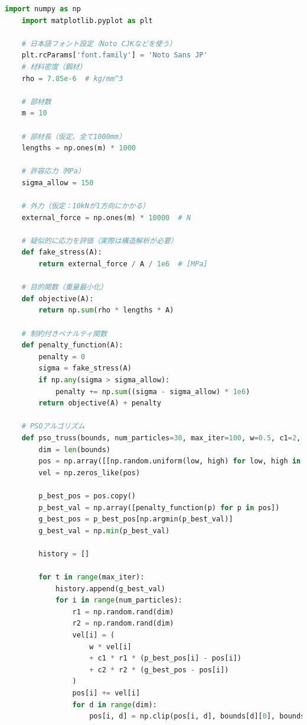 \begin{lstlisting}[language=Python, caption=PSOによるトラス構造の最適設計, label=lst:kadai7_code]
    import numpy as np
    import matplotlib.pyplot as plt
    
    # 日本語フォント設定（Noto CJKなどを使う）
    plt.rcParams['font.family'] = 'Noto Sans JP'
    # 材料密度（鋼材）
    rho = 7.85e-6  # kg/mm^3
    
    # 部材数
    m = 10
    
    # 部材長（仮定、全て1000mm）
    lengths = np.ones(m) * 1000
    
    # 許容応力（MPa）
    sigma_allow = 150
    
    # 外力（仮定：10kNが1方向にかかる）
    external_force = np.ones(m) * 10000  # N
    
    # 疑似的に応力を評価（実際は構造解析が必要）
    def fake_stress(A):
        return external_force / A / 1e6  # [MPa]
    
    # 目的関数（重量最小化）
    def objective(A):
        return np.sum(rho * lengths * A)
    
    # 制約付きペナルティ関数
    def penalty_function(A):
        penalty = 0
        sigma = fake_stress(A)
        if np.any(sigma > sigma_allow):
            penalty += np.sum((sigma - sigma_allow) * 1e6)
        return objective(A) + penalty
    
    # PSOアルゴリズム
    def pso_truss(bounds, num_particles=30, max_iter=100, w=0.5, c1=2, c2=2):
        dim = len(bounds)
        pos = np.array([[np.random.uniform(low, high) for low, high in bounds] for _ in range(num_particles)])
        vel = np.zeros_like(pos)
    
        p_best_pos = pos.copy()
        p_best_val = np.array([penalty_function(p) for p in pos])
        g_best_pos = p_best_pos[np.argmin(p_best_val)]
        g_best_val = np.min(p_best_val)
    
        history = []
    
        for t in range(max_iter):
            history.append(g_best_val)
            for i in range(num_particles):
                r1 = np.random.rand(dim)
                r2 = np.random.rand(dim)
                vel[i] = (
                    w * vel[i]
                    + c1 * r1 * (p_best_pos[i] - pos[i])
                    + c2 * r2 * (g_best_pos - pos[i])
                )
                pos[i] += vel[i]
                for d in range(dim):
                    pos[i, d] = np.clip(pos[i, d], bounds[d][0], bounds[d][1])
    

\end{lstlisting}
